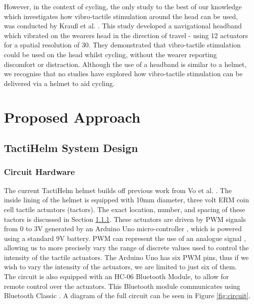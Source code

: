 \documentclass{interim}
\begin{document}
However, in the context of cycling, the only study to the best of our knowledge which investigates how vibro-tactile stimulation around the head can be used, was conducted by Krau{\ss} et al. \cite{krauss2021head}. This study developed a navigational headband which vibrated on the wearers head in the direction of travel - using 12 actuators for a spatial resolution of 30\degree{}. They demonstrated that vibro-tactile stimulation could be used on the head whilst cycling, without the wearer reporting discomfort or distraction. Although the use of a headband is similar to a helmet, we recognise that no studies have explored how vibro-tactile stimulation can be delivered via a helmet to aid cycling.



\section{Proposed Approach}
\subsection{TactiHelm System Design}\label{sec:system-design}
\subsubsection{Circuit Hardware}\label{sec:helmet-design}
The current TactiHelm helmet builds off previous work from Vo et al. \cite{10.1145/3411763.3451580}. The inside lining of the helmet is equipped with 10mm diameter, three volt ERM coin cell tactile actuators (tactors). The exact location, number, and spacing of these tactors is discussed in Section \ref{sec:helmet-design}. These actuators are driven by PWM signals from 0 to 3V generated by an Arduino Uno micro-controller \cite{arduinouno}, which is powered using a standard 9V battery. PWM can represent the use of an analogue signal \cite{kart2001pulse}, allowing us to more precisely vary the range of discrete values used to control the intensity of the tactile actuators. The Arduino Uno has six PWM pins, thus if we wish to vary the intensity of the actuators, we are limited to just six of them. The circuit is also equipped with an HC-06 Bluetooth Module, to allow for remote control over the actuators. This Bluetooth module communicates using Bluetooth Classic \cite{hc06}. A diagram of the full circuit can be seen in Figure \ref{fig:circuit}.
\end{document}
